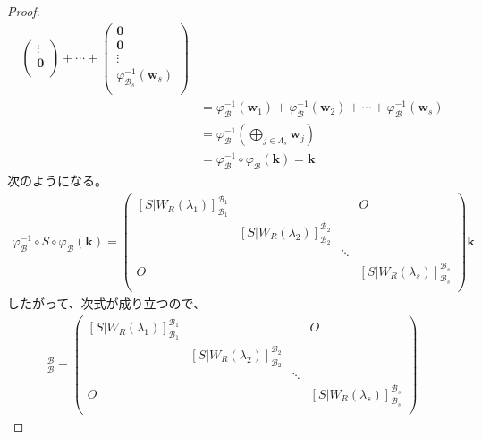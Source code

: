 \documentclass[dvipdfmx]{jsarticle}
\begin{document}
\begin{proof}
\begin{align*}
\begin{pmatrix}
 \vdots \\
\mathbf{0} \\
\end{pmatrix} + \cdots + \begin{pmatrix}
\mathbf{0} \\
\mathbf{0} \\
 \vdots \\
\varphi_{\mathcal{B}_{s}}^{- 1}\left( \mathbf{w}_{s} \right) \\
\end{pmatrix} \\
&= \varphi_{\mathcal{B}}^{- 1}\left( \mathbf{w}_{1} \right) + \varphi_{\mathcal{B}}^{- 1}\left( \mathbf{w}_{2} \right) + \cdots + \varphi_{\mathcal{B}}^{- 1}\left( \mathbf{w}_{s} \right) \\
&= \varphi_{\mathcal{B}}^{- 1}\left( \bigoplus_{j \in \varLambda_{s}} \mathbf{w}_{j} \right) \\
&= \varphi_{\mathcal{B}}^{- 1} \circ \varphi_{\mathcal{B}}\left( \mathbf{k} \right) = \mathbf{k}
\end{align*}
次のようになる。
\begin{align*}
\varphi_{\mathcal{B}}^{- 1} \circ S \circ \varphi_{\mathcal{B}}\left( \mathbf{k} \right) = \begin{pmatrix}
\left[S|W_{R}\left( \lambda_{1} \right) \right]_{\mathcal{B}_{1}}^{\mathcal{B}_{1}} & \  & \  & O \\
\  & \left[S|W_{R}\left( \lambda_{2} \right) \right]_{\mathcal{B}_{2}}^{\mathcal{B}_{2}} & \  & \  \\
\  & \  & \ddots & \  \\
O & \  & \  & \left[S|W_{R}\left( \lambda_{s} \right) \right]_{\mathcal{B}_{s}}^{\mathcal{B}_{s}} \\
\end{pmatrix}\mathbf{k}
\end{align*}
したがって、次式が成り立つので、
\begin{align*}
[S]_{\mathcal{B}}^{\mathcal{B}} = \begin{pmatrix}
\left[S|W_{R}\left( \lambda_{1} \right) \right]_{\mathcal{B}_{1}}^{\mathcal{B}_{1}} & \  & \  & O \\
\  & \left[S|W_{R}\left( \lambda_{2} \right) \right]_{\mathcal{B}_{2}}^{\mathcal{B}_{2}} & \  & \  \\
\  & \  & \ddots & \  \\
O & \  & \  & \left[S|W_{R}\left( \lambda_{s} \right) \right]_{\mathcal{B}_{s}}^{\mathcal{B}_{s}} \\
\end{pmatrix}

\end{align*}
\end{proof}
\end{document}
